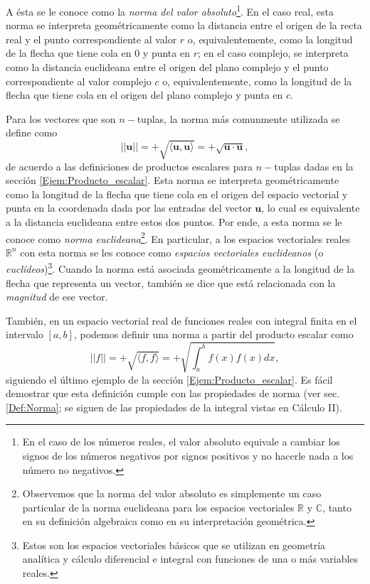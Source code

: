 \documentclass[notasLineal]{subfile}
\begin{document}
\noindent A ésta se le conoce como la \emph{norma del valor absoluto}\footnote{En el caso de los números reales, el valor absoluto equivale a cambiar los signos de los números negativos por signos positivos y no hacerle nada a los número no negativos.}. En el caso real, esta norma se interpreta geométricamente como la distancia entre el origen de la recta real y el punto correspondiente al valor $r$ o, equivalentemente, como la longitud de la flecha que tiene cola en $0$ y punta en $r$; en el caso complejo, se interpreta como la distancia euclideana entre el origen del plano complejo y el punto correspondiente al valor complejo $c$ o, equivalentemente, como la longitud de la flecha que tiene cola en el origen del plano complejo y punta en $c$. 

\vspace{3mm}

Para los vectores que son $n-$tuplas, la norma más comunmente utilizada se define como $$||\mathbf{u}|| = +\sqrt{\langle\mathbf{u},\mathbf{u}\rangle} = +\sqrt{\mathbf{u}\cdot\mathbf{u}},$$ \noindent de acuerdo a las definiciones de productos escalares para $n-$tuplas dadas en la sección \ref{Ejem:Producto_escalar}. Esta norma se interpreta geométricamente como la longitud de la flecha que tiene cola en el origen del espacio vectorial y punta en la coordenada dada por las entradas del vector $\mathbf{u}$, lo cual es equivalente a la distancia euclideana entre estos dos puntos. Por ende, a esta norma se le conoce como \emph{norma euclideana}\footnote{Observemos que la norma del valor absoluto es simplemente un caso particular de la norma euclideana para los espacios vectoriales $\mathbb{R}$ y $\mathbb{C}$, tanto en su definición algebraica como en su interpretación geométrica.}. En particular, a los espacios vectoriales reales $\mathbb{R}^n$ con esta norma se les conoce como \emph{espacios vectoriales euclideanos} (o \emph{euclídeos})\footnote{Estos son los espacios vectoriales básicos que se utilizan en geometría analítica y cálculo diferencial e integral con funciones de una o más variables reales.}. Cuando la norma está asociada geométricamente a la longitud de la flecha que representa un vector, también se dice que está relacionada con la \emph{magnitud} de ese vector.

\vspace{3mm}

También, en un espacio vectorial real de funciones reales con integral finita en el intervalo $[a,b]$, podemos definir una norma a partir del producto escalar como $$||f|| = +\sqrt{\langle f,f\rangle} = +\sqrt{\int_a^b f(x)f(x) dx},$$ \noindent siguiendo el último ejemplo de la sección \ref{Ejem:Producto_escalar}. Es fácil demostrar que esta definición cumple con las propiedades de norma (ver sec. \ref{Def:Norma}; se siguen de las propiedades de la integral vistas en Cálculo II). 
\end{document}
